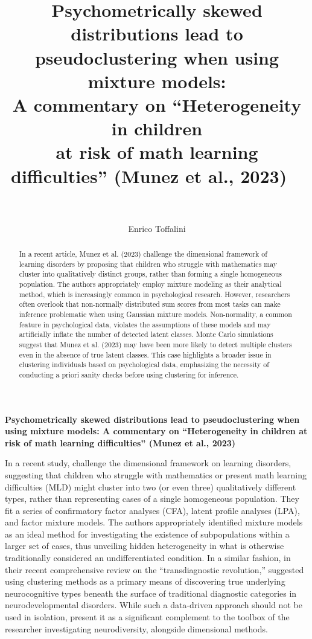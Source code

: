 \documentclass[letterpaper,11pt]{article}
\title{%
  \LARGE Psychometrically skewed distributions lead to pseudoclustering when using mixture models: \\ 
   \Large A commentary on “Heterogeneity in children \\ at risk of math learning difficulties” \large (Munez et al., 2023) 
  \ \\
  \ \\
}
\author{Enrico Toffalini}
\affil{Department of General Psychology, University of Padova,  Italy}
\affil{Phone: +39 049 827 6256, \\ Email: enrico.toffalini@unipd.it, \\ Address: Via Venezia, 8, 35131, Padova, italy}
\begin{document}
\maketitle
\newpage

\begin{abstract}
In a recent article, Munez et al. (2023) challenge the dimensional framework of learning disorders by proposing that children who struggle with mathematics may cluster into qualitatively distinct groups, rather than forming a single homogeneous population. The authors appropriately employ mixture modeling as their analytical method, which is increasingly common in psychological research. However, researchers often overlook that non-normally distributed sum scores from most tasks can make inference problematic when using Gaussian mixture models. Non-normality, a common feature in psychological data, violates the assumptions of these models and may artificially inflate the number of detected latent classes. Monte Carlo simulations suggest that Munez et al. (2023) may have been more likely to detect multiple clusters even in the absence of true latent classes. This case highlights a broader issue in clustering individuals based on psychological data, emphasizing the necessity of conducting a priori sanity checks before using clustering for inference.
\end{abstract}

\newpage

\begin{center} 
\textbf{Psychometrically skewed distributions lead to pseudoclustering when using mixture models: A commentary on “Heterogeneity in children at risk of math learning difficulties” (Munez et al., 2023)}
\end{center}

In a recent study,  challenge the dimensional framework on learning disorders, suggesting that children who struggle with mathematics or present math learning difficulties (MLD) might cluster into two (or even three) qualitatively different types, rather than representing cases of a single homogeneous population. They fit a series of confirmatory factor analyses (CFA), latent profile analyses (LPA), and factor mixture models. The authors appropriately identified mixture models as an ideal method for investigating the existence of subpopulations within a larger set of cases, thus unveiling hidden heterogeneity in what is otherwise traditionally considered an undifferentiated condition. In a similar fashion, in their recent comprehensive review on the “transdiagnostic revolution,”  suggested using clustering methods as a primary means of discovering true underlying neurocognitive types beneath the surface of traditional diagnostic categories in neurodevelopmental disorders. While such a data-driven approach should not be used in isolation,  present it as a significant complement to the toolbox of the researcher investigating neurodiversity, alongside dimensional methods.
\end{document}
